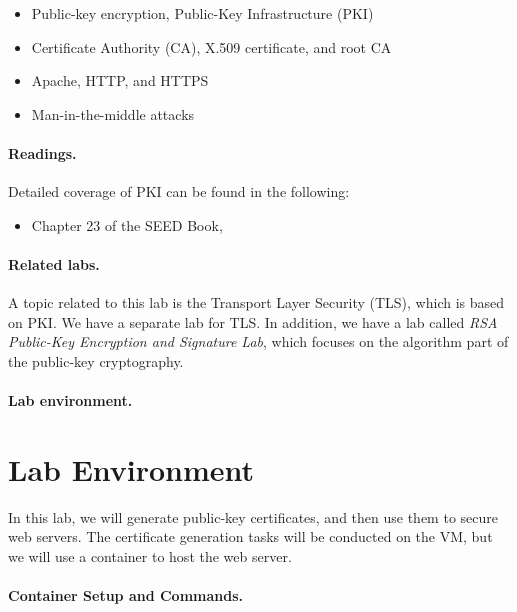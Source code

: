 \begin{itemize}[noitemsep]
\item Public-key encryption, Public-Key Infrastructure (PKI)
\item Certificate Authority (CA), X.509 certificate, and root CA 
\item Apache, HTTP, and HTTPS
\item Man-in-the-middle attacks
\end{itemize}





\paragraph{Readings.}
Detailed coverage of PKI can be found in the following:

\begin{itemize}
\item Chapter 23 of the SEED Book, \seedbook
\end{itemize}


\paragraph{Related labs.}
A topic related to this lab is the Transport Layer Security (TLS), which is based on  
PKI. We have a separate lab for TLS.
In addition, we have a lab called \textit{RSA Public-Key Encryption and Signature Lab}, 
which focuses on the algorithm part of the public-key cryptography.


\paragraph{Lab environment.} \seedenvironmentC 


\section{Lab Environment}

In this lab, we will generate public-key certificates, and then
use them to secure web servers. The certificate generation 
tasks will be conducted on the VM, but we will use 
a container to host the web server. 

\paragraph{Container Setup and Commands.}




